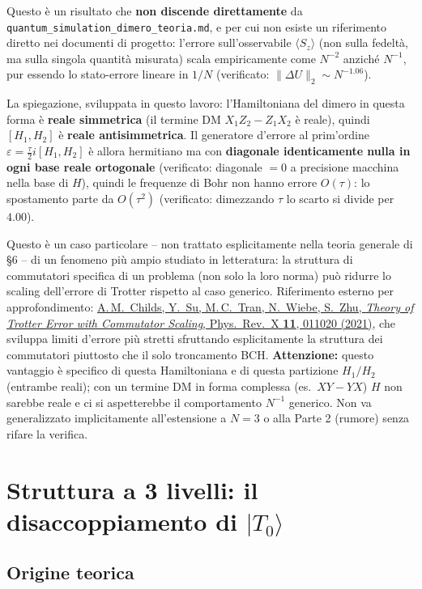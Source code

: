 \documentclass[11pt,a4paper]{article}
\begin{document}
Questo è un risultato che \textbf{non discende direttamente} da
\texttt{quantum\_simulation\_dimero\_teoria.md}, e per cui non esiste un
riferimento diretto nei documenti di progetto: l'errore sull'osservabile
$\langle S_z\rangle$ (non sulla fedeltà, ma sulla singola quantità
misurata) scala empiricamente come $N^{-2}$ anziché $N^{-1}$, pur essendo
lo stato-errore lineare in $1/N$ (verificato: $\|\Delta U\|_2\sim N^{-1.06}$).

La spiegazione, sviluppata in questo lavoro: l'Hamiltoniana del dimero in
questa forma è \textbf{reale simmetrica} (il termine DM $X_1Z_2-Z_1X_2$ è
reale), quindi $[H_1,H_2]$ è \textbf{reale antisimmetrica}. Il generatore
d'errore al prim'ordine $\varepsilon=\frac\tau2 i[H_1,H_2]$ è allora
hermitiano ma con \textbf{diagonale identicamente nulla in ogni base reale
ortogonale} (verificato: diagonale $=0$ a precisione macchina nella base di
$H$), quindi le frequenze di Bohr non hanno errore $O(\tau)$: lo spostamento
parte da $O(\tau^2)$ (verificato: dimezzando $\tau$ lo scarto si divide per
$4.00$).

Questo è un caso particolare -- non trattato esplicitamente nella teoria
generale di \S6 -- di un fenomeno più ampio studiato in letteratura: la
struttura di commutatori specifica di un problema (non solo la loro norma)
può ridurre lo scaling dell'errore di Trotter rispetto al caso generico.
Riferimento esterno per approfondimento:
\href{https://arxiv.org/abs/1912.08854}{A.\,M.\ Childs, Y.\ Su, M.\,C.\ Tran,
N.\ Wiebe, S.\ Zhu, \emph{Theory of Trotter Error with Commutator Scaling},
Phys.\ Rev.\ X \textbf{11}, 011020 (2021)}, che sviluppa limiti d'errore più
stretti sfruttando esplicitamente la struttura dei commutatori piuttosto che
il solo troncamento BCH. \textbf{Attenzione:} questo vantaggio è specifico di
questa Hamiltoniana e di questa partizione $H_1/H_2$ (entrambe reali); con
un termine DM in forma complessa (es.\ $XY-YX$) $H$ non sarebbe reale e ci
si aspetterebbe il comportamento $N^{-1}$ generico. Non va generalizzato
implicitamente all'estensione a $N=3$ o alla Parte 2 (rumore) senza rifare
la verifica.

\section{Struttura a 3 livelli: il disaccoppiamento di $|T_0\rangle$}

\subsection{Origine teorica}
\end{document}
